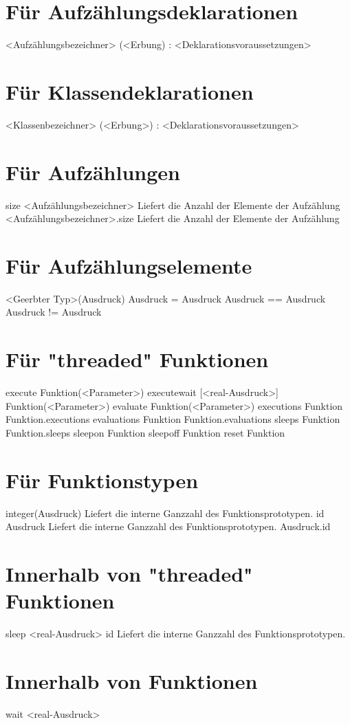 \section{Für Aufzählungsdeklarationen}
<Aufzählungsbezeichner> (<Erbung) : <Deklarationsvoraussetzungen>

\section{Für Klassendeklarationen}
<Klassenbezeichner> (<Erbung>) : <Deklarationsvoraussetzungen>

\section{Für Aufzählungen}
size <Aufzählungsbezeichner>			Liefert die Anzahl der Elemente der Aufzählung
<Aufzählungsbezeichner>.size			Liefert die Anzahl der Elemente der Aufzählung

\section{Für Aufzählungselemente}
<Geerbter Typ>(Ausdruck)
Ausdruck = Ausdruck
Ausdruck == Ausdruck
Ausdruck != Ausdruck

\section{Für "threaded" Funktionen}
execute Funktion(<Parameter>)
executewait [<real-Ausdruck>] Funktion(<Parameter>)
evaluate Funktion(<Parameter>)
executions Funktion
Funktion.executions
evaluations Funktion
Funktion.evaluations
sleeps Funktion
Funktion.sleeps
sleepon Funktion
sleepoff Funktion
reset Funktion

\section{Für Funktionstypen}
integer(Ausdruck)				Liefert die interne Ganzzahl des Funktionsprototypen.
id Ausdruck					Liefert die interne Ganzzahl des Funktionsprototypen.
Ausdruck.id

\section{Innerhalb von "threaded" Funktionen}
sleep <real-Ausdruck>
id						Liefert die interne Ganzzahl des Funktionsprototypen.

\section{Innerhalb von Funktionen}
wait <real-Ausdruck>


